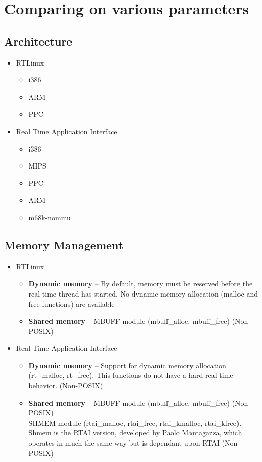 \documentclass[paper=letter, fontsize=12pt]{article}
\newcommand\rtai{Real Time Application Interface}
\newcommand\rtlinux{RTLinux}
\begin{document}
    \section{Comparing on various parameters}
    \subsection{Architecture}
    \begin{itemize}
        \item \rtlinux
        \begin{itemize}
            \item i386
            \item ARM
            \item PPC
        \end{itemize}
        \item \rtai
        \begin{itemize}
            \item i386
            \item MIPS
            \item PPC
            \item ARM
            \item m68k-nommu
        \end{itemize}
    \end{itemize}
    
    \subsection{Memory Management}
    \begin{itemize}
        \item \rtlinux
        \begin{itemize}
            \item \textbf{Dynamic memory} -- By default, memory must be reserved before the real time thread has started. No dynamic memory allocation (malloc and free functions) are available
            \item \textbf{Shared memory} -- MBUFF module (mbuff\_alloc, mbuff\_free) (Non-POSIX)
        \end{itemize}
        \item \rtai
        \begin{itemize}
            \item \textbf{Dynamic memory} -- Support for dynamic memory allocation (rt\_malloc, rt\_free). This functions do not have a hard real time behavior. (Non-POSIX)
            \item \textbf{Shared memory} -- MBUFF module (mbuff\_alloc, mbuff\_free) (Non-POSIX)
            \\ SHMEM module (rtai\_malloc, rtai\_free, rtai\_kmalloc, rtai\_kfree). Shmem is the RTAI version, developed by Paolo Mantagazza, which operates in much the same way but is dependant upon RTAI (Non-POSIX)
        \end{itemize}
    \end{itemize}
    
\end{document}

